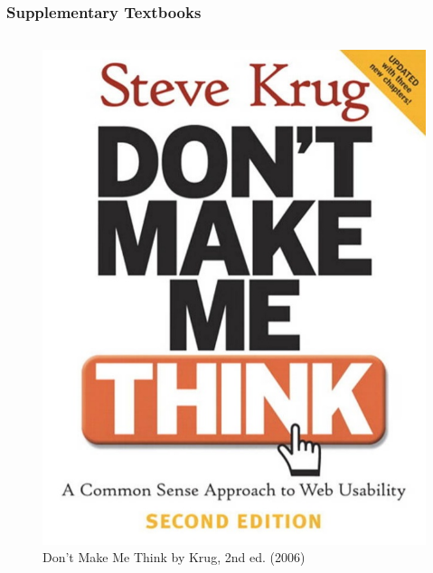 \documentclass{beamer}
\begin{document}
\begin{frame}
	\frametitle{Supplementary Textbooks}
	
	\begin{columns}[t] %
		
		\captionsetup{justification=centering}
		
		
		\begin{figure}
			
			\includegraphics[width=0.8\linewidth]{think}
			\caption{Don't Make Me Think by Krug, 2nd ed. (2006)}
		\end{figure}
		

\end{columns}
\end{frame}
\end{document}
